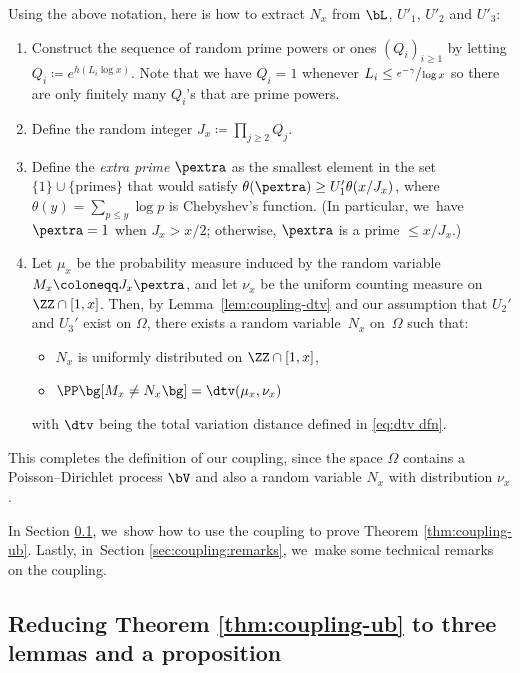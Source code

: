 Using the above notation, here is how to extract $N_x$ from $\bL$, $U'_1$, $U'_2$ and $U'_3$:
\begin{enumerate}
\item\label{step:1} Construct the sequence of random prime powers or ones $(Q_i)_{i \ge 1}$ by letting $Q_i \coloneqq e^{h(L_i\log x)}$. Note that we have $Q_i = 1$ whenever $L_i \le \sfrac{e^{-\gamma}}{\log x}$ so there are only finitely many $Q_i$'s that are prime powers.

\item\label{step:2} Define the random integer $J_x \coloneqq \prod_{j \ge 2} Q_j$.

\item\label{step:3} Define the \emph{extra prime} $\pextra$ as the smallest element in the set $\{1\}\cup\{\text{primes}\}$ that would satisfy $\theta(\pextra)\ge U_1'\theta(x/J_x)$, where $\theta(y)=\sum_{p\le y}\log p$ is Chebyshev's function. (In particular, we~have $\pextra=1$ when $J_x>x/2$; otherwise, $\pextra$ is a prime $\le x/J_x$.)

\item\label{step:4} Let $\mu_x$ be the probability measure induced by the random variable $M_x\coloneqq J_x\pextra$, and let $\nu_x$ be the uniform counting measure on $\ZZ\cap[1,x]$. Then, by Lemma~\ref{lem:coupling-dtv} and our assumption that $U_2'$ and $U_3'$ exist on $\Omega$, there exists a random variable~$N_x$ on~$\Omega$ such that:

\begin{itemize}
\item $N_x$ is uniformly distributed on $\ZZ\cap[1,x]$,
\item $\PP\bg[M_x\neq N_x\bg]=\dtv(\mu_x,\nu_x)$
\end{itemize}
with $\dtv$ being the total variation distance defined in \eqref{eq:dtv dfn}.
\end{enumerate}

This completes the definition of our coupling, since the space $\Omega$ contains a Poisson--Dirichlet process $\bV$ and also a random variable $N_x$ with distribution $\nu_x$.

In Section \ref{sec:coupling:reduction}, we~show how to use the coupling to prove Theorem \ref{thm:coupling-ub}. Lastly, in~Section \ref{sec:coupling:remarks}, we~make some technical remarks on the coupling.

\subsection{Reducing Theorem \ref{thm:coupling-ub} to three lemmas and a proposition}\label{sec:coupling:reduction}

